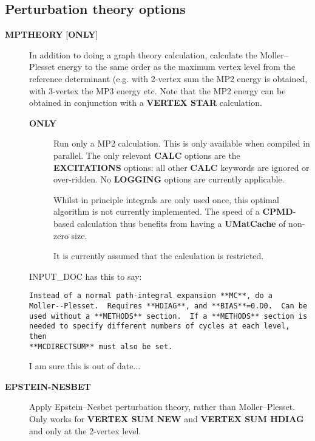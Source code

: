 \documentclass[openany,a4paper,10pt]{manual}
\begin{document}
\subsection{Perturbation theory options}
\begin{description}
\item[\textbf{MPTHEORY} {[}\textbf{ONLY}{]}]
In addition to doing a graph theory calculation, calculate the Moller--Plesset
energy to the same order as the maximum vertex level from the
reference determinant (e.g. with 2-vertex sum the MP2 energy is
obtained, with 3-vertex the MP3 energy etc.  Note that the MP2 energy
can be obtained in conjunction with a \textbf{VERTEX STAR} calculation.
\begin{description}
\item[\textbf{ONLY}]
Run only a MP2 calculation.  This is only available when
compiled in parallel.  The only relevant \textbf{CALC} options are the
\textbf{EXCITATIONS} options: all other \textbf{CALC} keywords are ignored
or over-ridden.  No \textbf{LOGGING} options are currently applicable.

Whilst in principle integrals are only used once, this optimal
algorithm is not currently implemented.  The speed of a \textbf{CPMD}-based
calculation thus benefits from having a \textbf{UMatCache} of non-zero size.

\begin{notice}[warning]
It is currently assumed that the calculation is restricted.
\end{notice}

\end{description}

\begin{notice}[note]
INPUT\_DOC has this to say:

\begin{Verbatim}[commandchars=@\[\]]
Instead of a normal path-integral expansion **MC**, do a
Moller--Plesset.  Requires **HDIAG**, and **BIAS**=0.D0.  Can be
used without a **METHODS** section.  If a **METHODS** section is
needed to specify different numbers of cycles at each level, then
**MCDIRECTSUM** must also be set.
\end{Verbatim}

I am sure this is out of date...
\end{notice}

\item[\textbf{EPSTEIN-NESBET}]
Apply Epstein--Nesbet perturbation theory, rather than
Moller--Plesset.  Only works for \textbf{VERTEX SUM NEW} and \textbf{VERTEX
SUM HDIAG} and only at the 2-vertex level.


\end{description}
\end{document}
